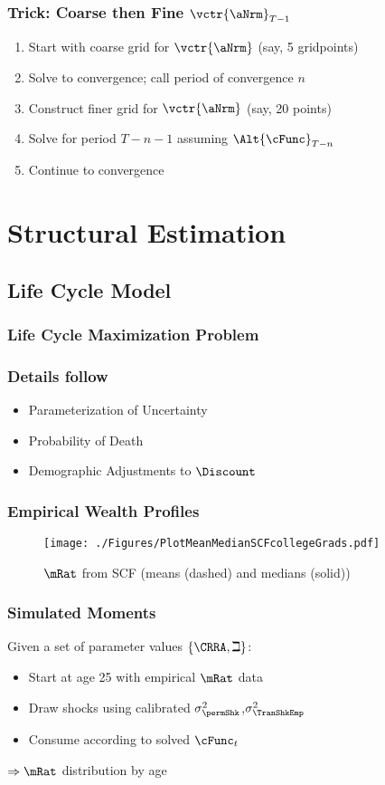 \documentclass{beamer}
\begin{document}
\begin{frame}
\frametitle{Trick: Coarse then Fine $\vctr{\aNrm}_{T-1}$}

\begin{enumerate}
\item Start with coarse grid for $\vctr{\aNrm}$ (say, 5 gridpoints)
\item Solve to convergence; call period of convergence $n$
\item Construct finer grid for $\vctr{\aNrm}$ (say, 20 points)
\item Solve for period $T-n-1$ assuming $\Alt{\cFunc}_{T-n}$ 
\item Continue to convergence
\end{enumerate}

\end{frame}

\section{Structural Estimation}
\subsection{Life Cycle Model}

\begin{frame}
\frametitle{Life Cycle Maximization Problem}


\end{frame}

\begin{frame}
\frametitle{Details follow~\cite{cagettiWprofiles}}
\begin{itemize}
\item Parameterization of Uncertainty
\item Probability of Death
\item Demographic Adjustments to $\Discount$
\end{itemize}
\end{frame}

\begin{frame}
\frametitle{Empirical Wealth Profiles}
\begin{figure}
    \texttt{[image: ./Figures/PlotMeanMedianSCFcollegeGrads.pdf]}
    \caption{$\mRat$ from SCF (means (dashed) and medians (solid))}
    \label{fig:MeanMedianSCF}
\end{figure}
\end{frame}

\begin{frame}
\frametitle{Simulated Moments}

Given a set of parameter values $\{\CRRA,\beth\}$:
\begin{itemize}
\item Start at age 25 with empirical $\mRat$ data
\item Draw shocks using calibrated $\sigma^{2}_{\permShk}$,$\sigma^{2}_{\TranShkEmp}$
\item Consume according to solved $\cFunc_{t}$
\end{itemize}
\pause 
$\Rightarrow \mRat$ distribution by age
\end{frame}
\end{document}
